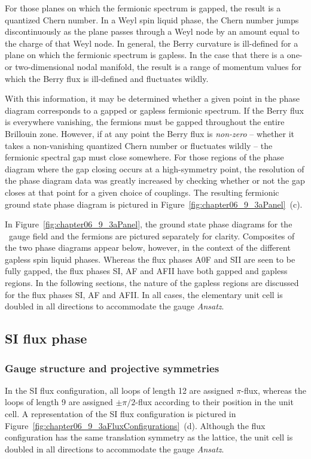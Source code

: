 For those planes on which the fermionic spectrum is gapped, the result is a quantized Chern number.
In a Weyl spin liquid phase, the Chern number jumps discontinuously as the plane passes through a Weyl node by an amount equal to the charge of that Weyl node.
In general, the Berry curvature is ill-defined for a plane on which the fermionic spectrum is gapless.
In the case that there is a one- or two-dimensional nodal manifold, the result is a range of momentum values for which the Berry flux is ill-defined and fluctuates wildly.

With this information, it may be determined whether a given point in the phase diagram corresponds to a gapped or gapless fermionic spectrum.
If the Berry flux is everywhere vanishing, the fermions must be gapped throughout the entire Brillouin zone.
However, if at any point the Berry flux is \textit{non-zero} -- whether it takes a non-vanishing quantized Chern number or fluctuates wildly -- the fermionic spectral gap must close somewhere.
For those regions of the phase diagram where the gap closing occurs at a high-symmetry point, the resolution of the phase diagram data was greatly increased by checking whether or not the gap closes at that point for a given choice of couplings. 
The resulting fermionic ground state phase diagram is pictured in  Figure~\ref{fig:chapter06_9_3aPanel}~(c).

In Figure~\ref{fig:chapter06_9_3aPanel}, the ground state phase diagrams for the \ZZ~gauge field and the fermions are pictured separately for clarity.
Composites of the two phase diagrams appear below, however, in the context of the different gapless spin liquid phases.
Whereas the flux phases A0F and SII are seen to be fully gapped, the flux phases SI, AF and AFII have both gapped and gapless regions.
In the following sections, the nature of the gapless regions are discussed for the flux phases SI, AF and AFII.
In all cases, the elementary unit cell is doubled in all directions to accommodate the gauge \textit{Ansatz}.


%
%
\subsection{SI flux phase}
\label{section:chapter06_SIPhase}
%
%
\subsubsection{Gauge structure and projective symmetries}
%
%
In the SI flux configuration, all loops of length 12 are assigned $\pi$-flux, whereas the loops of length 9 are assigned $\pm \pi/2$-flux according to their position in the unit cell.
A representation of the SI flux configuration is pictured in Figure~\ref{fig:chapter06_9_3aFluxConfigurations}~(d).
Although the flux configuration has the same translation symmetry as the lattice, the unit cell is doubled in all directions to accommodate the gauge \textit{Ansatz}.

